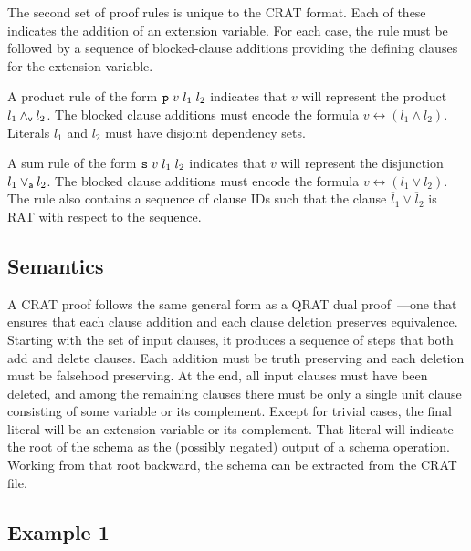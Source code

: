 \documentclass{llncs}
\newcommand{\pand}{\mathbin{\land_{\sf v}}}
\newcommand{\por}{\mathbin{\lor_{\sf a}}}
\newcommand{\obar}[1]{\overline{#1}}
\newcommand{\ite}{\mbox{\it ITE}}
\newcommand{\pite}{\mbox{\it ITE}_{\sf v}}
\begin{document}
The second set of proof rules is unique to the CRAT format.  Each of
these indicates the addition of an extension variable.  For each case,
the rule must be followed by a sequence of blocked-clause additions
providing the defining clauses for the extension variable.

A product rule of the form ${\tt p}\;v\;l_1\;l_2$ indicates that $v$
will represent the product $l_1 \pand l_2$.  The blocked clause
additions must encode the formula $v \leftrightarrow (l_1 \land l_2)$.
Literals $l_1$ and $l_2$ must have disjoint dependency sets.

A sum rule of the form ${\tt s}\;v\;l_1\;l_2$ indicates that $v$ will
represent the disjunction $l_1 \por l_2$.  The blocked clause
additions must encode the formula $v \leftrightarrow (l_1 \lor l_2)$.
The rule also contains a sequence of clause IDs such that the clause
$\obar{l}_1 \lor \obar{l}_2$ is RAT with respect to the sequence.


\subsection{Semantics}

A CRAT proof follows the same general form as a QRAT dual proof~\cite{bryant:cade:2021}---one
that ensures that each clause addition and each clause deletion
preserves equivalence.  Starting with the set of input clauses, it
produces a sequence of steps that both add and delete clauses.  Each
addition must be truth preserving and each deletion must be falsehood
preserving.  At the end, all input clauses must have been deleted, and
among the remaining clauses there must be only a single unit clause
consisting of some variable or its complement.  Except for trivial
cases, the final literal will be an extension variable or its
complement.  That literal will indicate the root of the schema as the
(possibly negated) output of a schema operation.  Working from that
root backward, the schema can be extracted from the CRAT file.

\subsection{Example 1}
\end{document}
